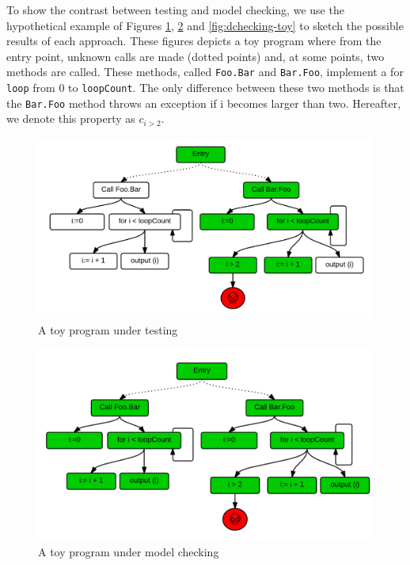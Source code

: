 \documentclass[times]{smrauth}
\begin{document}
To show the contrast between testing and model checking, we use the hypothetical example of Figures \ref{fig:testing-toy}, \ref{fig:checking-toy} and \ref{fig:dchecking-toy} to sketch the possible results of each approach. These figures depicts a toy program where from the entry point, unknown calls are made (dotted points) and, at some points, two methods are called. These methods, called \texttt{Foo.Bar} and \texttt{Bar.Foo}, implement a for \texttt{loop} from 0 to \texttt{loopCount}. The only difference between these two methods is that the \texttt{Bar.Foo} method throws an exception if i becomes larger than two. Hereafter, we denote this property as $c_{i > 2}$.  


\begin{figure}[h!]
  \centering
    \includegraphics{media/dmc.png}
    \caption{A toy program under testing
    \label{fig:testing-toy}}
\end{figure}

\begin{figure}[h!]
  \centering
    \includegraphics{media/mc.png}
    \caption{A toy program under model checking
    \label{fig:checking-toy}}
\end{figure}
\end{document}
